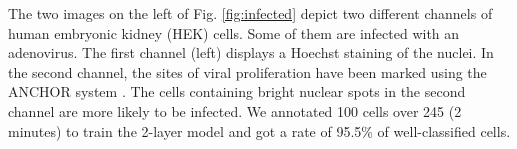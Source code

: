 \documentclass{article}
\begin{document}
The two images on the left of Fig. \ref{fig:infected} depict two different channels of human embryonic kidney (HEK) cells. 
Some of them are infected with an adenovirus. 
The first channel (left) displays a Hoechst staining of the nuclei.
In the second channel, the sites of viral proliferation have been marked using the ANCHOR system \cite{mariame2018real}.
The cells containing bright nuclear spots in the second channel are more likely to be infected.
We annotated 100 cells over 245 (2 minutes) to train the 2-layer model and got a rate of 95.5\% of well-classified cells.

\begin{figure}[h!]
  \begin{center}
\end{center}
\end{figure}
\end{document}
